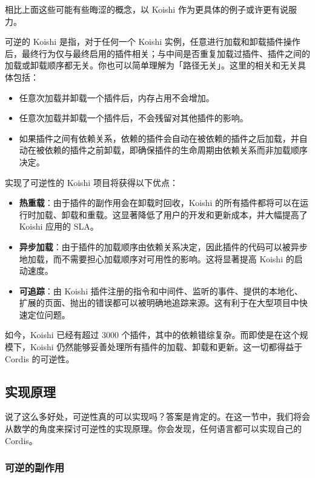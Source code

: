 \documentclass[
  chinese,
  11pt,
]{article}
\providecommand{\tightlist}{%
  \setlength{\itemsep}{0pt}\setlength{\parskip}{0pt}}
\begin{document}
相比上面这些可能有些晦涩的概念，以 Koishi
作为更具体的例子或许更有说服力。

可逆的 Koishi 是指，对于任何一个 Koishi
实例，任意进行加载和卸载插件操作后，最终行为仅与最终启用的插件相关；与中间是否重复加载过插件、插件之间的加载或卸载顺序都无关。你也可以简单理解为「路径无关」。这里的相关和无关具体包括：

\begin{itemize}
\tightlist
\item
  任意次加载并卸载一个插件后，内存占用不会增加。
\item
  任意次加载并卸载一个插件后，不会残留对其他插件的影响。
\item
  如果插件之间有依赖关系，依赖的插件会自动在被依赖的插件之后加载，并自动在被依赖的插件之前卸载，即确保插件的生命周期由依赖关系而非加载顺序决定。
\end{itemize}

实现了可逆性的 Koishi 项目将获得以下优点：

\begin{itemize}
\tightlist
\item
  \textbf{热重载}：由于插件的副作用会在卸载时回收，Koishi
  的所有插件都将可以在运行时加载、卸载和重载。这显著降低了用户的开发和更新成本，并大幅提高了
  Koishi 应用的 SLA。
\item
  \textbf{异步加载}：由于插件的加载顺序由依赖关系决定，因此插件的代码可以被异步地加载，而不需要担心加载顺序对可用性的影响。这将显著提高
  Koishi 的启动速度。
\item
  \textbf{可追踪}：由 Koishi
  插件注册的指令和中间件、监听的事件、提供的本地化、扩展的页面、抛出的错误都可以被明确地追踪来源。这有利于在大型项目中快速定位问题。
\end{itemize}

如今，Koishi 已经有超过 3000
个插件，其中的依赖错综复杂。而即使是在这个规模下，Koishi
仍然能够妥善处理所有插件的加载、卸载和更新。这一切都得益于 Cordis
的可逆性。

\subsection{实现原理}\label{ux5b9eux73b0ux539fux7406}

说了这么多好处，可逆性真的可以实现吗？答案是肯定的。在这一节中，我们将会从数学的角度来探讨可逆性的实现原理。你会发现，任何语言都可以实现自己的
Cordis。

\subsubsection{可逆的副作用}\label{ux53efux9006ux7684ux526fux4f5cux7528}
\end{document}
